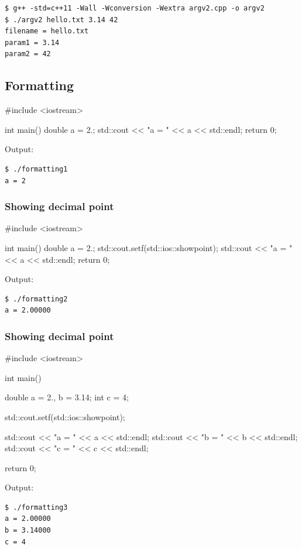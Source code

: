 \documentclass[12pt,letterpaper,twoside]{article}
\begin{document}
\begin{verbatim}
$ g++ -std=c++11 -Wall -Wconversion -Wextra argv2.cpp -o argv2
$ ./argv2 hello.txt 3.14 42
filename = hello.txt
param1 = 3.14
param2 = 42
\end{verbatim}

\subsection{Formatting}
\begin{cpp}
#include <iostream>

int main() {
  double a = 2.;
  std::cout << "a = " << a << std::endl;
  return 0;
}
\end{cpp}

Output:

\begin{verbatim}
$ ./formatting1
a = 2
\end{verbatim}

\subsubsection{Showing decimal point}
\begin{cpp}
#include <iostream>

int main() {
  double a = 2.;
  std::cout.setf(std::ios::showpoint);
  std::cout << "a = " << a << std::endl;
  return 0;
}
\end{cpp}

Output:

\begin{verbatim}
$ ./formatting2
a = 2.00000
\end{verbatim}

\subsubsection{Showing decimal point}
\begin{cpp}
#include <iostream>

int main() {
  double a = 2., b = 3.14;
  int c = 4;

  std::cout.setf(std::ios::showpoint);

  std::cout << "a = " << a << std::endl;
  std::cout << "b = " << b << std::endl;
  std::cout << "c = " << c << std::endl;

  return 0;
}
\end{cpp}

Output:

\begin{verbatim}
$ ./formatting3
a = 2.00000
b = 3.14000
c = 4
\end{verbatim}
\end{document}
